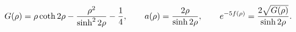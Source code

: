 \begin{equation}
G(\rho)=\rho \coth{2\rho}-{\rho^2 \over \sinh^2{2\rho}}-{1\over4},\qquad
a(\rho)={2\rho \over \sinh{2\rho}},\qquad
e^{-5 f(\rho)}={2 \sqrt{G(\rho)}\over \sinh{2\rho}}. \label{mnsol}
\end{equation}

